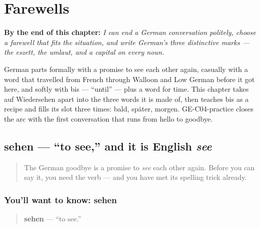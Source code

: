 
\chapter{Farewells}
\label{ch:farewells}

\begin{chapteropening}
\textbf{By the end of this chapter:} \emph{I can end a German conversation politely, choose a farewell that fits the situation, and write German's three distinctive marks — the eszett, the umlaut, and a capital on every noun.}

German parts formally with a promise to see each other again, casually with a word that travelled from French through Walloon and Low German before it got here, and softly with bis — \textquotedblleft{}until\textquotedblright{} — plus a word for time. This chapter takes auf Wiedersehen apart into the three words it is made of, then teaches bis as a recipe and fills its slot three times: bald, später, morgen. GE-C04-practice closes the arc with the first conversation that runs from hello to goodbye.
\end{chapteropening}

\section[sehen]{sehen — \textquotedblleft{}to see,\textquotedblright{} and it is English \emph{see}}

\label{lesson:GE-C04-sehen}



\begin{quote}
The German goodbye is a promise to \emph{see} each other again. Before you can say it, you need the verb — and you have met its spelling trick already.
\end{quote}

\subsection*{You'll want to know: sehen}
\begin{quote}
\textbf{sehen} — \textquotedblleft{}to see.\textquotedblright{}
\end{quote}

